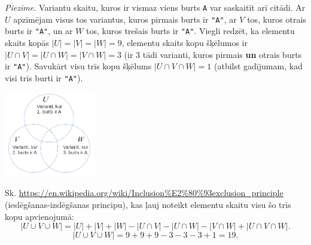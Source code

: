\documentclass[11pt]{article}
\begin{document}


{\em Piezīme.} Variantu skaitu, kuros ir vismaz viens burts {\tt A} var saskaitīt arī citādi. 
Ar $U$ apzīmējam visus tos variantus, kuros
pirmais burts ir {\tt "A"}, ar $V$ \textendash{} tos, kuros otrais burts ir {\tt "A"}, un ar 
$W$ \textendash{} tos, kuros trešais burts ir {\tt "A"}. Viegli redzēt, ka elementu skaits
kopās $|U|=|V|=|W|=9$, elementu skaits kopu šķēlumos ir $|U \cap V| = |U \cap W| = |V \cap W| = 3$
(ir $3$ tādi varianti, kuros pirmais {\bf un} otrais burts ir {\tt "A"}). Savukārt visu 
trīs kopu šķēlums $|U \cap V \cap W| = 1$ (atbilst gadījumam, kad visi trīs 
burti ir {\tt "A"}). 

\begin{center}
\includegraphics[width=0.3\textwidth]{venn-diagram.png}
\end{center}

Sk. \url{https://en.wikipedia.org/wiki/Inclusion%E2%80%93exclusion_principle} (ieslēgšanas-izslēgšanas principu), 
kas ļauj noteikt elementu skaitu visu šo trīs kopu apvienojumā:
\[ \left| U \cup V \cup W \right| = \left| U \right| + \left| V \right| + \left| W \right| - 
\left| U \cap V \right| - \left| U \cap W \right| - \left| V \cap W \right| + \left| U \cap V \cap W \right|. \]
\[ \left| U \cup V \cup W \right| = 9+9+9 - 3 - 3 - 3+1 = 19. \]
\end{document}
